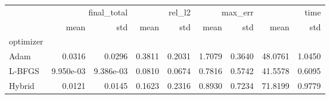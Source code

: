 \begin{tabular}{lrrrrrrrr}
\toprule
 & \multicolumn{2}{r}{final_total} & \multicolumn{2}{r}{rel_l2} & \multicolumn{2}{r}{max_err} & \multicolumn{2}{r}{time} \\
 & mean & std & mean & std & mean & std & mean & std \\
optimizer &  &  &  &  &  &  &  &  \\
\midrule
Adam & 0.0316 & 0.0296 & 0.3811 & 0.2031 & 1.7079 & 0.3640 & 48.0761 & 1.0450 \\
L-BFGS & 9.950e-03 & 9.386e-03 & 0.0810 & 0.0674 & 0.7816 & 0.5742 & 41.5578 & 0.6095 \\
Hybrid & 0.0121 & 0.0145 & 0.1623 & 0.2316 & 0.8930 & 0.7234 & 71.8199 & 0.9779 \\
\bottomrule
\end{tabular}
